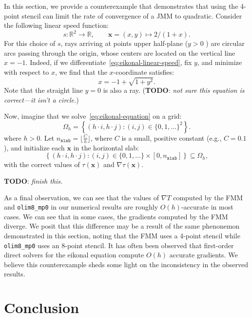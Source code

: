 \documentclass{siamart190516}
\newcommand{\m}[1]{\boldsymbol{#1}}
\begin{document}
In this section, we provide a counterexample that demonstrates that
using the 4-point stencil can limit the rate of convergence of a JMM
to quadratic. Consider the following linear speed function:
\begin{equation}
  s : \mathbb{R}^2 \to \mathbb{R}, \qquad \m{x} = (x, y) \mapsto 2/(1 + x).
\end{equation}
For this choice of $s$, rays arriving at points upper half-plane
($y > 0$ ) are circular arcs passing through the origin, whose centers
are located on the vertical line $x = -1$. Indeed, if we
differentiate~\eqref{eq:eikonal-linear-speed}, fix $y$, and minimize
with respect to $x$, we find that the $x$-coordinate satisfies:
\begin{equation}
  x = -1 + \sqrt{1 + y^2}.
\end{equation}
Note that the straight line $y = 0$ is also a ray. (\textbf{TODO}:
\emph{not sure this equation is correct---it isn't a circle.})

Now, imagine that we solve~\eqref{eq:eikonal-equation} on a grid:
\begin{equation}
  \Omega_h = \left\{(h \cdot i, h \cdot j) : (i, j) \in \{0, 1, \hdots\}^2\right\}.
\end{equation}
where $h > 0$. Let $n_{\texttt{slab}} = \lfloor \tfrac{C}{h} \rfloor$,
where $C$ is a small, positive constant (e.g., $C = 0.1$), and
initialize each $\m{x}$ in the horizontal slab:
\begin{equation}
  \left\{(h \cdot i, h \cdot j) : (i, j) \in \{0, 1, \hdots\} \times [0, n_{\texttt{slab}}]\right\} \subseteq \Omega_h,
\end{equation}
with the correct values of $\tau(\m{x})$ and $\nabla\tau(\m{x})$.

\textbf{TODO}: \emph{finish this.}

As a final observation, we can see that the values of $\nabla T$
computed by the FMM and \texttt{olim8\_mp0} in our numerical results
are roughly $O(h)$-accurate in most cases. We can see that in some
cases, the gradients computed by the FMM diverge. We posit that this
difference may be a result of the same phenonemon demonstrated in this
section, noting that the FMM uses a 4-point stencil while
\texttt{olim8\_mp0} uses an 8-point stencil. It has often been
observed that first-order direct solvers for the eikonal equation
compute $O(h)$ accurate gradients. We believe this counterexample
sheds some light on the inconsistency in the observed results.

\section{Conclusion}
\end{document}
